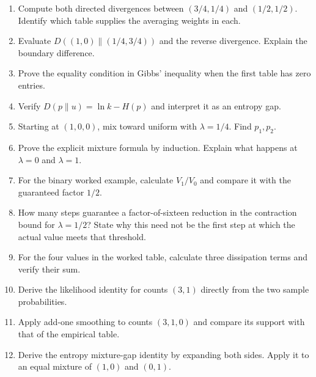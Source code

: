 \documentclass[11pt,oneside,openany]{book}
\theoremstyle{definition}
\theoremstyle{remark}
\newenvironment{exercises}{\begin{enumerate}[label=\thechapter.\arabic*,ref=\thechapter.\arabic*,leftmargin=2.8em,itemsep=6pt]}{\end{enumerate}}
\numberwithin{equation}{chapter}
\begin{document}
\begin{exercises}

\item 

Compute both directed divergences between \((3/4,1/4)\) and \((1/2,1/2)\). Identify which table supplies the averaging weights in each.

\item 

Evaluate \(D((1,0)\|(1/4,3/4))\) and the reverse divergence. Explain the boundary difference.

\item 

Prove the equality condition in Gibbs' inequality when the first table has zero entries.

\item 

Verify \(D(p\|u)=\ln k-H(p)\) and interpret it as an entropy gap.

\item 

Starting at \((1,0,0)\), mix toward uniform with \(\lambda=1/4\). Find \(p_1,p_2\).

\item 

Prove the explicit mixture formula by induction. Explain what happens at \(\lambda=0\) and \(\lambda=1\).

\item 

For the binary worked example, calculate \(V_1/V_0\) and compare it with the guaranteed factor \(1/2\).

\item 

How many steps guarantee a factor-of-sixteen reduction in the contraction bound for \(\lambda=1/2\)? State why this need not be the first step at which the actual value meets that threshold.

\item 

For the four values in the worked table, calculate three dissipation terms and verify their sum.

\item 

Derive the likelihood identity for counts \((3,1)\) directly from the two sample probabilities.

\item 

Apply add-one smoothing to counts \((3,1,0)\) and compare its support with that of the empirical table.

\item 

Derive the entropy mixture-gap identity by expanding both sides. Apply it to an equal mixture of \((1,0)\) and \((0,1)\).

\end{exercises}
\end{document}
